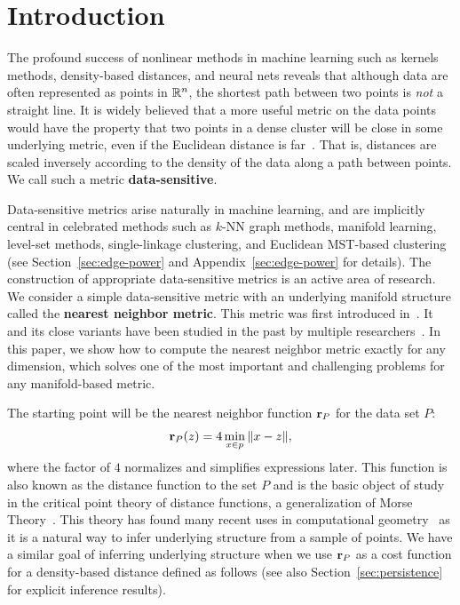 \section{Introduction}

The profound success of nonlinear methods in machine learning such as kernels methods, density-based distances, and neural nets reveals that although data are often represented as points in $\mathbb{R}^n$, the shortest path between two points is \emph{not} a straight line.
It is widely believed that a more useful metric on the data points would
have the property that two points in a dense cluster will be close in some
underlying metric, even if the Euclidean distance is
far~\cite{alamgir12shortest,
cohen15approximating, vincent03, bijral11semiSupLearningDBD}.
That is, distances are scaled inversely according to the density of the data along a path between points.
We call such a metric \textbf{data-sensitive}.

Data-sensitive metrics arise naturally in machine learning, and are
implicitly central in celebrated methods such as $k$-NN graph methods,
manifold learning, level-set methods, single-linkage clustering, and
Euclidean MST-based clustering (see Section~\ref{sec:edge-power} and
Appendix~\ref{sec:edge-power} for details).
The construction of appropriate data-sensitive metrics is an active area of research.
We consider a simple data-sensitive metric with an underlying manifold structure called the \textbf{nearest neighbor metric}.
This metric was first introduced in~\cite{cohen15approximating}. It and its close variants have been studied in the past by
multiple
researchers~\cite{hwang2016, cohen15approximating, sajama05estimatingDBDM,
bijral11semiSupLearningDBD,vincent03}.
In this paper, we show how to compute the nearest neighbor metric exactly
for any dimension, which solves one of the most important and challenging
problems for any manifold-based metric.

The starting point will be the nearest neighbor function $\mathbf{r}_P$ for
the data set $P$:
\[
\mathbf{r}_P(z) = 4\min_{x\in p} \|x-z\|,
\]
where the factor of $4$ normalizes and simplifies expressions later.
This function is also known as the distance function to the set $P$ and is the basic object of study in the critical point theory of distance functions, a generalization of Morse Theory~\cite{grove93critical}.
This theory has found many recent uses in computational geometry~\cite{chazal08smooth,chazal09sampling} as it is a natural way to infer underlying structure from a sample of points.
We have a similar goal of inferring underlying structure when we use $\mathbf{r}_P$ as a cost function for a density-based distance defined as follows (see also Section~\ref{sec:persistence} for explicit inference results).

